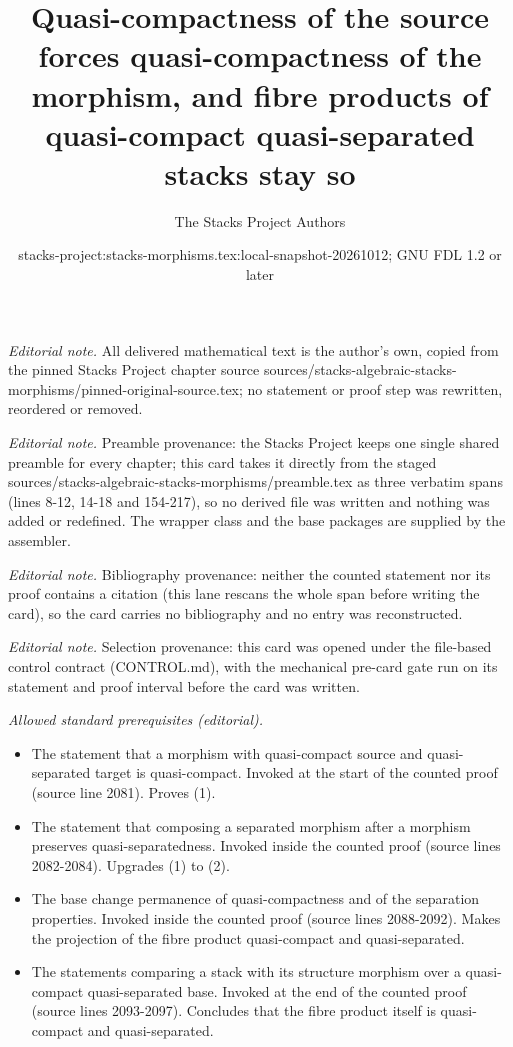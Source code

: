 \documentclass[10pt,a4paper]{amsart}
\title{Quasi-compactness of the source forces quasi-compactness of the morphism, and fibre products of quasi-compact quasi-separated stacks stay so}
\author{The Stacks Project Authors}
\date{stacks-project:stacks-morphisms.tex:local-snapshot-20261012; GNU FDL 1.2 or later}
\theoremstyle{plain}
\theoremstyle{definition}
\theoremstyle{remark}
\numberwithin{equation}{subsection}
\begin{document}
\maketitle
\noindent\textit{Editorial note.} All delivered mathematical text is the author's own, copied from the pinned Stacks Project chapter source sources/stacks-algebraic-stacks-morphisms/pinned-original-source.tex; no statement or proof step was rewritten, reordered or removed.\par\medskip
\noindent\textit{Editorial note.} Preamble provenance: the Stacks Project keeps one single shared preamble for every chapter; this card takes it directly from the staged sources/stacks-algebraic-stacks-morphisms/preamble.tex as three verbatim spans (lines 8-12, 14-18 and 154-217), so no derived file was written and nothing was added or redefined. The wrapper class and the base packages are supplied by the assembler.\par\medskip
\noindent\textit{Editorial note.} Bibliography provenance: neither the counted statement nor its proof contains a citation (this lane rescans the whole span before writing the card), so the card carries no bibliography and no entry was reconstructed.\par\medskip
\noindent\textit{Editorial note.} Selection provenance: this card was opened under the file-based control contract (CONTROL.md), with the mechanical pre-card gate run on its statement and proof interval before the card was written.\par\medskip
\noindent\textit{Allowed standard prerequisites (editorial).}\begin{itemize}
\item The statement that a morphism with quasi-compact source and quasi-separated target is quasi-compact. Invoked at the start of the counted proof (source line 2081). Proves (1).
\item The statement that composing a separated morphism after a morphism preserves quasi-separatedness. Invoked inside the counted proof (source lines 2082-2084). Upgrades (1) to (2).
\item The base change permanence of quasi-compactness and of the separation properties. Invoked inside the counted proof (source lines 2088-2092). Makes the projection of the fibre product quasi-compact and quasi-separated.
\item The statements comparing a stack with its structure morphism over a quasi-compact quasi-separated base. Invoked at the end of the counted proof (source lines 2093-2097). Concludes that the fibre product itself is quasi-compact and quasi-separated.
\end{itemize}\medskip
\end{document}
